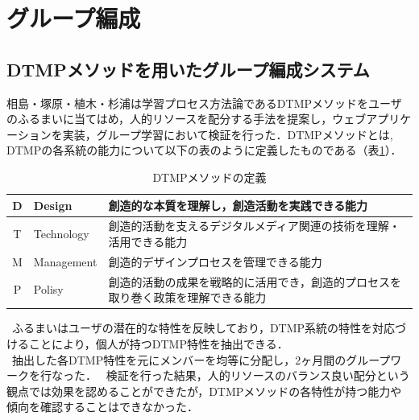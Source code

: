 \documentclass{funthesis}
\begin{document}
\section{グループ編成}

\subsection{DTMPメソッドを用いたグループ編成システム}

相島・塚原・植木・杉浦\cite{A5}は学習プロセス方法論であるDTMPメソッドをユーザのふるまいに当てはめ，人的リソースを配分する手法を提案し，ウェブアプリケーションを実装，グループ学習において検証を行った．DTMPメソッドとは,  DTMPの各系統の能力について以下の表のように定義したものである（表\ref{DTMP}）．

\begin{table}[h]
\begin{center}
  \caption{DTMPメソッドの定義}
  \begin{tabular}{|c|p{25mm}|p{105mm}|} \hline
    D & Design & 創造的な本質を理解し，創造活動を実践できる能力\tabularnewline \hline
    T & Technology & 
    創造的活動を支えるデジタルメディア関連の技術を理解・活用できる能力\tabularnewline \hline
    M &Management & 
    創造的デザインプロセスを管理できる能力\tabularnewline \hline
    P &Polisy &
    創造的活動の成果を戦略的に活用でき，創造的プロセスを取り巻く政策を理解できる能力\tabularnewline
    \hline
  \end{tabular}

  \label{DTMP}
  \end{center}
\end{table}


\ ふるまいはユーザの潜在的な特性を反映しており，DTMP系統の特性を対応づけることにより，個人が持つDTMP特性を抽出できる．\\
\ 抽出した各DTMP特性を元にメンバーを均等に分配し，2ヶ月間のグループワークを行なった．
\ 検証を行った結果，人的リソースのバランス良い配分という観点では効果を認めることができたが，DTMPメソッドの各特性が持つ能力や傾向を確認することはできなかった．
\end{document}
